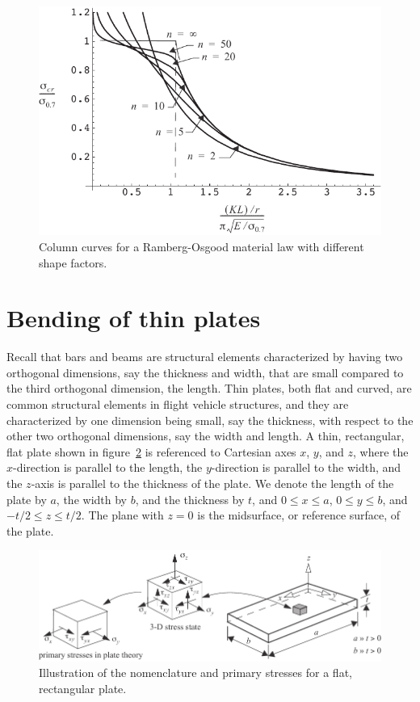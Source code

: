 \documentclass{AeroStructure-ERJohnson}
\begin{document}
\begin{figure}[!h]
\vspace*{-0.6pc}
\centerline{\includegraphics{Figure_11-21.pdf}}
\caption{Column curves for a Ramberg-Osgood material law with different shape factors.} \label{fig11.21}
\vspace*{-1.6pc}
\end{figure}

\section{Bending of thin plates}\label{sec11.6}

Recall that bars and beams are structural elements characterized by having two orthogonal dimensions, say the thickness and width, that are small compared to the third orthogonal dimension, the length. Thin plates, both flat and curved, are common structural elements in flight vehicle structures, and they are characterized by one dimension being small, say the thickness, with respect to the other two orthogonal dimensions, say the width and length. A thin, rectangular, flat plate shown in figure~\ref{fig11.22} is referenced to Cartesian axes $x$, $y$, and $z$, where the $x$-direction is parallel to the length, the $y$-direction is parallel to the width, and the $z$-axis is parallel to the thickness of the plate. We denote the length of the plate by $a$, the width by $b$, and the thickness by $t$, and $0 \leq x \leq a$, $0 \leq y \leq b$, and $-t/2 \leq z \leq t/2$. The plane with $z=0$ is the midsurface, or reference surface, of the plate.

\begin{figure}[!h]\vspace{-4pt}
\centerline{\includegraphics{Figure_11-22.pdf}}
\caption{Illustration of the nomenclature and primary stresses for a flat, rectangular plate.} \label{fig11.22}\vspace*{-4pt}
\end{figure}
\end{document}
